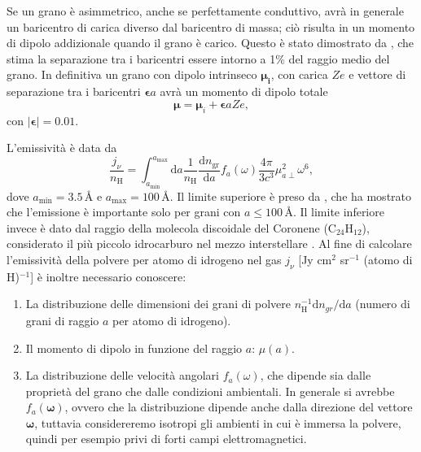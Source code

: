 Se un grano è asimmetrico, anche se perfettamente conduttivo, avrà in generale un baricentro di carica diverso dal baricentro di massa; ciò risulta in un momento di dipolo addizionale quando il grano è carico. Questo è stato dimostrato da \textcite{Purcell}, che stima la separazione tra i baricentri essere intorno a 1\% del raggio medio del grano. In definitiva un grano con dipolo intrinseco $\boldsymbol{\mu_{i}}$, con carica $Ze$ e vettore di separazione tra i baricentri $\boldsymbol{\epsilon}a$ avrà un momento di dipolo totale
\begin{equation}
\boldsymbol{\mu}=\boldsymbol{\mu}_{i}+\boldsymbol{\epsilon}aZe,
\end{equation}
con $\lvert\boldsymbol{\epsilon}\rvert=0.01$.

L'emissività è data da
\begin{equation}
\label{j}
\frac{j_{\nu}}{n_{\mathrm{H}}}=\int_{a_{\mathrm{min}}}^{a_{\mathrm{max}}}\!\mathrm{d}a\frac{1}{n_{\mathrm{H}}}\frac{\mathrm{d}n_{\mathrm{gr}}}{\mathrm{d}a}f_{a}(\omega)\frac{4\pi}{3c^{3}}\mu_{a\perp}^{2}\omega^{6},
\end{equation}
dove $a_{\mathrm{min}}=3.5$\,\AA{} e $a_{\mathrm{max}}=100$\,\AA{}. Il limite superiore è preso da \textcite{Hoyle}, che ha mostrato che l'emissione è importante solo per grani con $a\leqslant100$\,\AA{}. Il limite inferiore invece è dato dal raggio della molecola discoidale del Coronene (C$_{24}$H$_{12}$), considerato il più piccolo idrocarburo nel mezzo interstellare \parencite[161]{DL98b}.
Al fine di calcolare l'emissività della polvere per atomo di idrogeno nel gas $j_{\nu}$ [Jy cm$^{2}$ sr$^{-1}$ (atomo di H)$^{-1}$] è inoltre necessario conoscere:
\begin{enumerate}
	\item La distribuzione delle dimensioni dei grani di polvere $n_{\mathrm{H}}^{-1}\mathrm{d}n_{gr}/\mathrm{d}a$ (numero di grani di raggio $a$ per atomo di idrogeno).
	\item Il momento di dipolo in funzione del raggio $a$: $\mu(a)$.
	\item La distribuzione delle velocità angolari $f_{a}(\omega)$, che dipende sia dalle proprietà del grano che dalle condizioni ambientali. In generale si avrebbe $f_{a}(\boldsymbol{\omega})$, ovvero che la distribuzione dipende anche dalla direzione del vettore $\boldsymbol{\omega}$, tuttavia considereremo isotropi gli ambienti in cui è immersa la polvere, quindi per esempio privi di forti campi elettromagnetici.
\end{enumerate}

